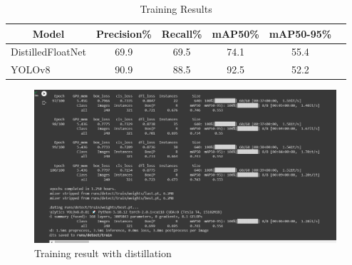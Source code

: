 \begin{enumerate}

\begin{table}
    \centering
    \label{tab:my_label}
\begin{tabular}{lccccr}
\hline \multicolumn{1}{c}{\textbf{Model}} & \textbf{Precision\%} & \textbf{Recall\%} & \textbf{mAP50\%} & \textbf{mAP50-95\%}\\
\hline 
DistilledFloatNet & 69.9 & 69.5 & 74.1 & 55.4\\
YOLOv8 & 90.9  & 88.5 & 92.5 & 52.2 \\
\hline
\end{tabular}
\caption{Training Results}
\label{table:training-1}
\end{table}

\vspace{\baselineskip}
\vspace{\baselineskip}

\begin{figure}[H]
\centering
	\includegraphics*[width = 14cm]{images/training-result-with-distillation.png}
	 \caption{Training result with distillation}
	\label{fig:t-auto}
\end{figure}


\end{enumerate}
